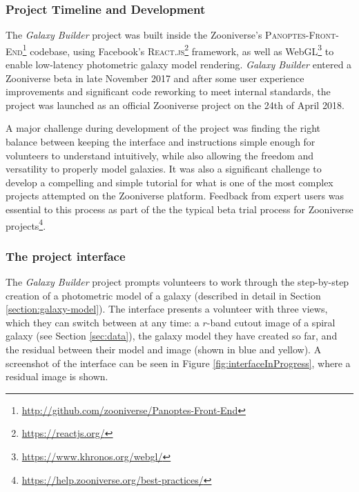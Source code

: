 \documentclass[../main.tex]{subfiles}
\begin{document}
\subsubsection{Project Timeline and Development}

The \textit{Galaxy Builder} project was built inside the Zooniverse's \citep{Simpson:2014:ZOW:2567948.2579215} \textsc{Panoptes-Front-End}\footnote{\url{http://github.com/zooniverse/Panoptes-Front-End}} codebase, using Facebook's \textsc{React.js}\footnote{\url{https://reactjs.org/}} framework, as well as WebGL\footnote{\url{https://www.khronos.org/webgl/}} to enable low-latency photometric galaxy model rendering. \textit{Galaxy Builder} entered a Zooniverse beta in late November 2017 and after some user experience improvements and significant code reworking to meet internal standards, the project was launched as an official Zooniverse project on the 24th of April 2018.

A major challenge during development of the project was finding the right balance between keeping the interface and instructions simple enough for volunteers to understand intuitively, while also allowing the freedom and versatility to properly model galaxies. It was also a significant challenge to develop a compelling and simple tutorial for what is one of the most complex projects attempted on the Zooniverse platform. Feedback from expert users was essential to this process as part of the the typical beta trial process for Zooniverse projects\footnote{\url{https://help.zooniverse.org/best-practices/}}.


\subsubsection{The project interface}

The \textit{Galaxy Builder} project prompts volunteers to work through the step-by-step creation of a photometric model of a galaxy (described in detail in Section \ref{section:galaxy-model}). The interface presents a volunteer with three views, which they can switch between at any time: a $r$-band cutout image of a spiral galaxy (see Section \ref{sec:data}), the galaxy model they have created so far, and the residual between their model and image (shown in blue and yellow). A screenshot of the interface can be seen in Figure \ref{fig:interfaceInProgress}, where a residual image is shown.
\end{document}
